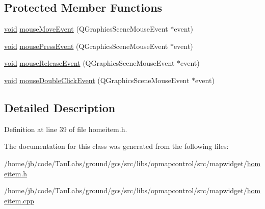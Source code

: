 \subsection*{\-Protected \-Member \-Functions}
\begin{DoxyCompactItemize}
\item 
\hyperlink{group___u_a_v_objects_plugin_ga444cf2ff3f0ecbe028adce838d373f5c}{void} \hyperlink{group___o_p_map_widget_ga547e723911d9f309c53c587dae90002a}{mouse\-Move\-Event} (\-Q\-Graphics\-Scene\-Mouse\-Event $\ast$event)
\item 
\hyperlink{group___u_a_v_objects_plugin_ga444cf2ff3f0ecbe028adce838d373f5c}{void} \hyperlink{group___o_p_map_widget_ga312ac9d1cba702ca33ba3f6fbc883bb1}{mouse\-Press\-Event} (\-Q\-Graphics\-Scene\-Mouse\-Event $\ast$event)
\item 
\hyperlink{group___u_a_v_objects_plugin_ga444cf2ff3f0ecbe028adce838d373f5c}{void} \hyperlink{group___o_p_map_widget_gabab0d6bb38eaad0414451df469b7dee2}{mouse\-Release\-Event} (\-Q\-Graphics\-Scene\-Mouse\-Event $\ast$event)
\item 
\hyperlink{group___u_a_v_objects_plugin_ga444cf2ff3f0ecbe028adce838d373f5c}{void} \hyperlink{group___o_p_map_widget_ga422b8f29836c5a4bafc485a6330408d8}{mouse\-Double\-Click\-Event} (\-Q\-Graphics\-Scene\-Mouse\-Event $\ast$event)
\end{DoxyCompactItemize}


\subsection{\-Detailed \-Description}


\-Definition at line 39 of file homeitem.\-h.



\-The documentation for this class was generated from the following files\-:\begin{DoxyCompactItemize}
\item 
/home/jb/code/\-Tau\-Labs/ground/gcs/src/libs/opmapcontrol/src/mapwidget/\hyperlink{homeitem_8h}{homeitem.\-h}\item 
/home/jb/code/\-Tau\-Labs/ground/gcs/src/libs/opmapcontrol/src/mapwidget/\hyperlink{homeitem_8cpp}{homeitem.\-cpp}\end{DoxyCompactItemize}
